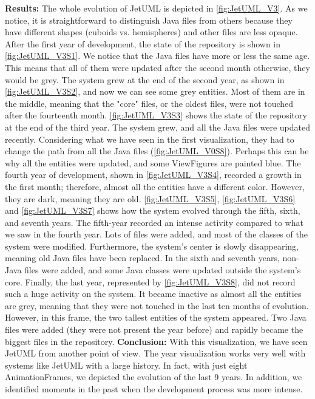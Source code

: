 \bigbreak
\noindent
\textbf{Results:}
The whole evolution of JetUML is depicted in \autoref{fig:JetUML_V3}. As we notice, it is straightforward to distinguish Java files from others because they have different shapes (cuboids vs. hemispheres)  and other files are less opaque. After the first year of development, the state of the repository is shown in \autoref{fig:JetUML_V3S1}. We notice that the Java files have more or less the same age. This means that all of them were updated after the second month otherwise, they would be grey. The system grew at the end of the second year, as shown in \autoref{fig:JetUML_V3S2}, and now we can see some grey entities. Most of them are in the middle, meaning that the "core" files, or the oldest files, were not touched after the fourteenth month.  \autoref{fig:JetUML_V3S3} shows the state of the repository at the end of the third year. The system grew, and all the Java files were updated recently. Considering what we have seen in the first visualization, they had to change the path from all the Java files (\autoref{fig:JetUML_V0S8}). Perhaps this can be why all the entities were updated, and some ViewFigures are painted blue. 
The fourth year of development, shown in  \autoref{fig:JetUML_V3S4}, recorded a growth in the first month; therefore, almost all the entities have a different color.
However, they are dark, meaning they are old. 
\autoref{fig:JetUML_V3S5},  \autoref{fig:JetUML_V3S6} and  \autoref{fig:JetUML_V3S7} shows how the system evolved through the fifth, sixth, and seventh years. The fifth-year recorded an intense activity compared to what we saw in the fourth year. Lots of files were added, and most of the classes of the system were modified. Furthermore, the system's center is slowly disappearing, meaning old Java files have been replaced. In the sixth and seventh years, non-Java files were added, and some Java classes were updated outside the system's core. Finally, the last year, represented by \autoref{fig:JetUML_V3S8}, did not record such a huge activity on the system. It became inactive as almost all the entities are grey, meaning that they were not touched in the last ten months of evolution. However, in this frame, the two tallest entities of the system appeared. Two Java files were added (they were not present the year before) and rapidly became the biggest files in the repository.  
\bigbreak
\noindent
\textbf{Conclusion:}
With this visualization, we have seen JetUML from another point of view. The year visualization works very well with systems like JetUML with a large history. In fact, with just eight AnimationFrames, we depicted the evolution of the last 9 years. In addition, we identified moments in the past when the development process was more intense. 
\bigbreak

